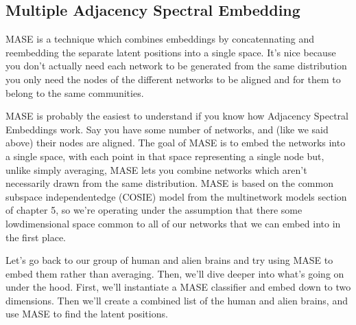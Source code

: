 \documentclass[letterpaper,10pt,english]{jupyterBook}
\begin{document}
\subsection{Multiple Adjacency Spectral Embedding}
\label{\detokenize{representations/ch6/multigraph-representation-learning:multiple-adjacency-spectral-embedding}}
\sphinxAtStartPar
MASE is a technique which combines embeddings by concatennating and re\sphinxhyphen{}embedding the separate latent positions into a single space. It’s nice because you don’t actually need each network to be generated from the same distribution \sphinxhyphen{} you only need the nodes of the different networks to be aligned and for them to belong to the same communities.

\sphinxAtStartPar
MASE is probably the easiest to understand if you know how Adjacency Spectral Embeddings work. Say you have some number of networks, and (like we said above) their nodes are aligned. The goal of MASE is to embed the networks into a single space, with each point in that space representing a single node \sphinxhyphen{} but, unlike simply averaging, MASE lets you combine networks which aren’t necessarily drawn from the same distribution. MASE is based on the common subspace independent\sphinxhyphen{}edge (COSIE) model from the multi\sphinxhyphen{}network models section of chapter 5, so we’re operating under the assumption that there  some low\sphinxhyphen{}dimensional space common to all of our networks that we can embed into in the first place.

\sphinxAtStartPar
Let’s go back to our group of human and alien brains and try using MASE to embed them rather than averaging. Then, we’ll dive deeper into what’s going on under the hood. First, we’ll instantiate a MASE classifier and embed down to two dimensions. Then we’ll create a combined list of the human and alien brains, and use MASE to find the latent positions.

\begin{sphinxVerbatim}[commandchars=\\\{\}]
     

  
    
\end{sphinxVerbatim}
\end{document}

